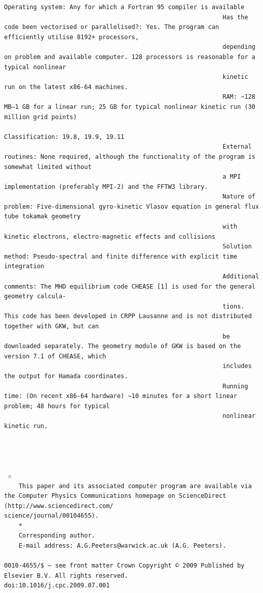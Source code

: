 \documentclass[a4paper]{article}
\newcommand{\gkwpagefont}{\fontsize{6.0pt}{7.55pt}\selectfont}
\begin{document}
\begin{Verbatim}[fontsize=\gkwpagefont]
                                                            Operating system: Any for which a Fortran 95 compiler is available
                                                            Has the code been vectorised or parallelised?: Yes. The program can efficiently utilise 8192+ processors,
                                                            depending on problem and available computer. 128 processors is reasonable for a typical nonlinear
                                                            kinetic run on the latest x86-64 machines.
                                                            RAM: ∼128 MB–1 GB for a linear run; 25 GB for typical nonlinear kinetic run (30 million grid points)
                                                            Classification: 19.8, 19.9, 19.11
                                                            External routines: None required, although the functionality of the program is somewhat limited without
                                                            a MPI implementation (preferably MPI-2) and the FFTW3 library.
                                                            Nature of problem: Five-dimensional gyro-kinetic Vlasov equation in general flux tube tokamak geometry
                                                            with kinetic electrons, electro-magnetic effects and collisions
                                                            Solution method: Pseudo-spectral and finite difference with explicit time integration
                                                            Additional comments: The MHD equilibrium code CHEASE [1] is used for the general geometry calcula-
                                                            tions. This code has been developed in CRPP Lausanne and is not distributed together with GKW, but can
                                                            be downloaded separately. The geometry module of GKW is based on the version 7.1 of CHEASE, which
                                                            includes the output for Hamada coordinates.
                                                            Running time: (On recent x86-64 hardware) ∼10 minutes for a short linear problem; 48 hours for typical
                                                            nonlinear kinetic run.




 ✩
    This paper and its associated computer program are available via the Computer Physics Communications homepage on ScienceDirect (http://www.sciencedirect.com/
science/journal/00104655).
    *
    Corresponding author.
    E-mail address: A.G.Peeters@warwick.ac.uk (A.G. Peeters).

0010-4655/$ – see front matter Crown Copyright © 2009 Published by Elsevier B.V. All rights reserved.
doi:10.1016/j.cpc.2009.07.001
\end{Verbatim}
\end{document}
